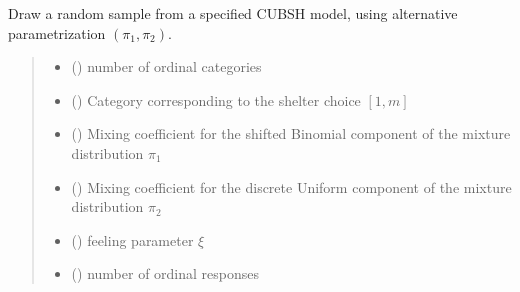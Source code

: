 \documentclass[letterpaper,10pt,english]{sphinxmanual}
\begin{document}
\begin{fulllineitems}
\label{\detokenize{cubmods:cubmods.cubsh.draw2}}
\pysigstartsignatures
{}
\pysigstopsignatures
\sphinxAtStartPar
Draw a random sample from a specified CUBSH model,
using alternative parametrization \((\pi_1, \pi_2)\).
\begin{quote}\begin{description}
\begin{itemize}
\item {} 
\sphinxAtStartPar
{} () \textendash{} number of ordinal categories

\item {} 
\sphinxAtStartPar
{} () \textendash{} Category corresponding to the shelter choice \([1,m]\)

\item {} 
\sphinxAtStartPar
{} () \textendash{} Mixing coefficient for the shifted Binomial component of the mixture distribution \(\pi_1\)

\item {} 
\sphinxAtStartPar
{} () \textendash{} Mixing coefficient for the discrete Uniform component of the mixture distribution \(\pi_2\)

\item {} 
\sphinxAtStartPar
{} () \textendash{} feeling parameter \(\xi\)

\item {} 
\sphinxAtStartPar
{} () \textendash{} number of ordinal responses


\end{itemize}
\end{description}
\end{quote}
\end{fulllineitems}
\end{document}
